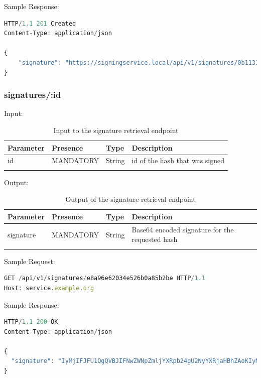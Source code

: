 Sample Response:

\begin{lstlisting}[caption={sign response}, captionpos=b, language=JavaScript, label={lst:signresponse}]
HTTP/1.1 201 Created
Content-Type: application/json

{
	"signature": "https://signingservice.local/api/v1/signatures/0b1131c417cafcc5a5f259d357903026f8e0c4f85e3ca0b68f3d55b8e32a55e8"
}
\end{lstlisting}

\subsubsection{signatures/:id}
Input:

\begin{longtable}{|l|l|l|l|}
	\hline
	\textbf{Parameter} & \textbf{Presence} & \textbf{Type} & \textbf{Description} \\ \hline
	id & MANDATORY & String & id of the hash that was signed \\ \hline
    \caption{Input to the signature retrieval endpoint}
\end{longtable}

Output:

\begin{longtable}{|l|l|l|l|}
	\hline
	\textbf{Parameter} & \textbf{Presence} & \textbf{Type} & \textbf{Description} \\ \hline
	signature & MANDATORY & String & Base64 encoded signature for the requested hash \\ \hline
	\caption{Output of the signature retrieval endpoint}
\end{longtable}

Sample Request:

\begin{lstlisting}[caption={signature request}, captionpos=b, language=JavaScript, label={lst:signaturerequest}]
GET /api/v1/signatures/e8a96e62034e526b0a85b2be HTTP/1.1
Host: service.example.org
\end{lstlisting}

Sample Response:

\begin{lstlisting}[caption={signature response}, captionpos=b, language=JavaScript, label={lst:signatureresponse}]
HTTP/1.1 200 OK
Content-Type: application/json

{
  "signature": "IyMjIFJFU1QgQVBJIFNwZWNpZmljYXRpb24gU2NyYXRjaHBhZAoKIyMjIyBQcmUtQXV0aCBlbmRw...b2ludCAKIyMjIyMgRW5kcG9pbnQKYGBgUE9TVCAvYXBpL3YxL3NpZ25gYGAK"
}
\end{lstlisting}

